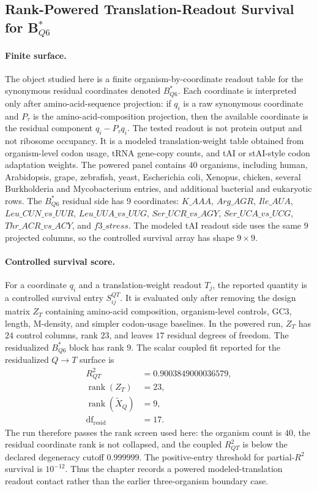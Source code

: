 \subsection{Rank-Powered Translation-Readout Survival for B$^{*}_{Q6}$}
\label{sec:q6-rank-powered-translation-survival-cross-layer}

\paragraph{Finite surface.}
The object studied here is a finite organism-by-coordinate readout table for the synonymous residual coordinates denoted $B^{*}_{Q6}$.  Each coordinate is interpreted only after amino-acid-sequence projection: if $q_i$ is a raw synonymous coordinate and $P_{\tau}$ is the amino-acid-composition projection, then the available coordinate is the residual component $q_i-P_{\tau}q_i$.  The tested readout is not protein output and not ribosome occupancy.  It is a modeled translation-weight table obtained from organism-level codon usage, tRNA gene-copy counts, and tAI or stAI-style codon adaptation weights.  The powered panel contains $40$ organisms, including human, Arabidopsis, grape, zebrafish, yeast, Escherichia coli, Xenopus, chicken, several Burkholderia and Mycobacterium entries, and additional bacterial and eukaryotic rows.  The $B^{*}_{Q6}$ residual side has $9$ coordinates: $K\_AAA$, $Arg\_AGR$, $Ile\_AUA$, $Leu\_CUN\_vs\_UUR$, $Leu\_UUA\_vs\_UUG$, $Ser\_UCR\_vs\_AGY$, $Ser\_UCA\_vs\_UCG$, $Thr\_ACR\_vs\_ACY$, and $f3\_stress$.  The modeled tAI readout side uses the same $9$ projected columns, so the controlled survival array has shape $9\times 9$.

\paragraph{Controlled survival score.}
For a coordinate $q_i$ and a translation-weight readout $T_j$, the reported quantity is a controlled survival entry $S^{QT}_{ij}$.  It is evaluated only after removing the design matrix $Z_T$ containing amino-acid composition, organism-level controls, GC3, length, M-density, and simpler codon-usage baselines.  In the powered run, $Z_T$ has $24$ control columns, rank $23$, and leaves $17$ residual degrees of freedom.  The residualized $B^{*}_{Q6}$ block has rank $9$.  The scalar coupled fit reported for the residualized $Q\to T$ surface is
$$
\begin{aligned}
R^2_{QT} &= 0.9003849000036579,\\
\operatorname{rank}(Z_T) &= 23,\\
\operatorname{rank}(\widetilde X_Q) &= 9,\\
\operatorname{df}_{\mathrm{resid}} &= 17.
\end{aligned}
$$
The run therefore passes the rank screen used here: the organism count is $40$, the residual coordinate rank is not collapsed, and the coupled $R^2_{QT}$ is below the declared degeneracy cutoff $0.999999$.  The positive-entry threshold for partial-$R^2$ survival is $10^{-12}$.  Thus the chapter records a powered modeled-translation readout contact rather than the earlier three-organism boundary case.

